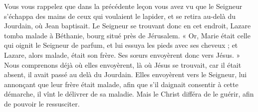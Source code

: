 Vous vous rappelez que dans la précédente leçon vous avez vu que le Seigneur s’échappa des mains de ceux qui voulaient le lapider, et se retira au-delà du Jourdain, où Jean baptisait. Le Seigneur se trouvant donc en cet endroit, Lazare tomba malade à Béthanie, bourg situé près de Jérusalem. « Or, Marie était celle qui oignit le Seigneur de parfum, et lui essuya les pieds avec ses cheveux ; et Lazare, alors malade, était son frère. Ses sœurs envoyèrent donc vers Jésus. » Nous comprenons déjà où elles envoyèrent, là où Jésus se trouvait, car il était absent, il avait passé au delà du Jourdain. Elles envoyèrent vers le Seigneur, lui annonçant que leur frère était malade, afin que s’il daignait consentir à cette démarche, il vînt le délivrer de sa maladie. Mais le Christ différa de le guérir, afin de pouvoir le ressusciter.
